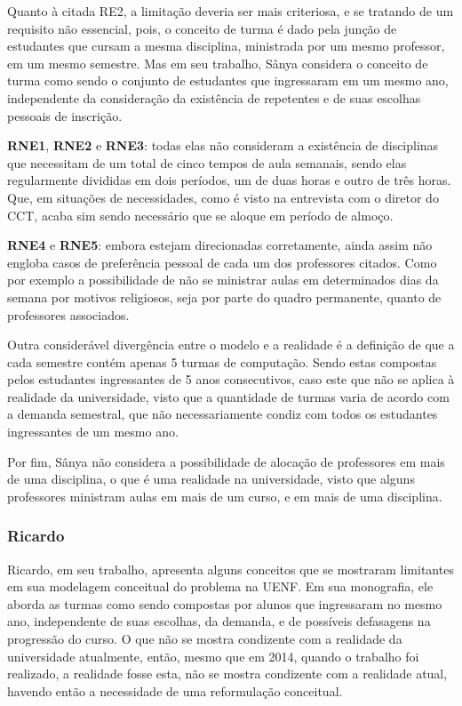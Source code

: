 Quanto à citada RE2, a limitação deveria ser mais criteriosa, e se tratando de um requisito não essencial, pois, o conceito de turma é dado pela junção de estudantes que cursam a mesma disciplina, ministrada por um mesmo professor, em um mesmo semestre. Mas em seu trabalho, Sânya considera o conceito de turma como sendo o conjunto de estudantes que ingressaram em um mesmo ano, independente da consideração da existência de repetentes e de suas escolhas pessoais de inscrição.

\textbf{RNE1}, \textbf{RNE2} e \textbf{RNE3}: todas elas não consideram a existência de disciplinas que necessitam de um total de cinco tempos de aula semanais, sendo elas regularmente divididas em dois períodos, um de duas horas e outro de três horas. Que, em situações de necessidades, como é visto na entrevista com o diretor do CCT, acaba sim sendo necessário que se aloque em período de almoço.

\textbf{RNE4} e \textbf{RNE5}: embora estejam direcionadas corretamente, ainda assim não engloba casos de preferência pessoal de cada um dos professores citados. Como por exemplo a possibilidade de não se ministrar aulas em determinados dias da semana por motivos religiosos, seja por parte do quadro permanente, quanto de professores associados.

Outra considerável divergência entre o modelo e a realidade é a definição de que a cada semestre contém apenas 5 turmas de computação. Sendo estas compostas pelos estudantes ingressantes de 5 anos consecutivos, caso este que não se aplica à realidade da universidade, visto que a quantidade de turmas varia de acordo com a demanda semestral, que não necessariamente condiz com todos os estudantes ingressantes de um mesmo ano.

Por fim, Sânya não considera a possibilidade de alocação de professores em mais de uma disciplina, o que é uma realidade na universidade, visto que alguns professores ministram aulas em mais de um curso, e em mais de uma disciplina.

\subsubsection{Ricardo}

Ricardo, em seu trabalho, apresenta alguns conceitos que se mostraram limitantes em sua modelagem conceitual do problema na UENF. Em sua monografia, ele aborda as turmas como sendo compostas por alunos que ingressaram no mesmo ano, independente de suas escolhas, da demanda, e de possíveis defasagens na progressão do curso. O que não se mostra condizente com a realidade da universidade atualmente, então, mesmo que em 2014, quando o trabalho foi realizado, a realidade fosse esta, não se mostra condizente com a realidade atual, havendo então a necessidade de uma reformulação conceitual.

